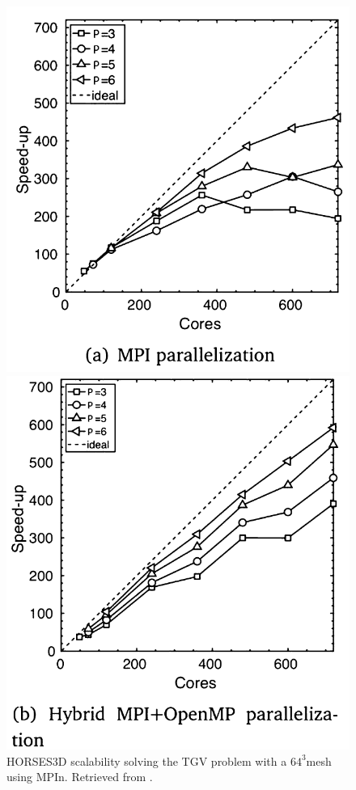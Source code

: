 \documentclass{article}
\begin{document}
  
\begin{figure}[htbp]
  \centering
  \begin{minipage}{0.45\textwidth}
    \centering
    \includegraphics[width=\linewidth]{HW1/figure 5.PNG}
    \caption{HORSES3D scalability solving the TGV problem with a $64^3$mesh using MPIn. Retrieved from \cite{ferrer2023high}.}
    \label{figure2}
  \end{minipage}
  \hfill %
  \begin{minipage}{0.45\textwidth}
    \centering
    \includegraphics[width=\linewidth]{HW1/figure 6.PNG}

\end{minipage}
\end{figure}
\end{document}
